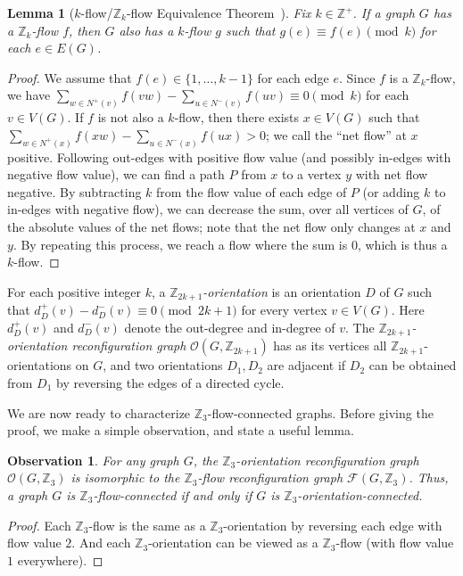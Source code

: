 \documentclass[a4paper,12pt]{article}
\theoremstyle{plain}
\newtheorem{lem}[theorem]{Lemma}
\newtheorem{obs}[theorem]{Observation}
\theoremstyle{definition}
\newcommand{\Z}{\mathbb{Z}}
\newcommand\F{\mathcal{F}}
\renewcommand\O{\mathcal{O}}
\begin{document}
\begin{lem}[$k$-flow/$\Z_k$-flow Equivalence Theorem~\cite{tutte54}]
	\label{Zk-k-equiv-lem}
	Fix $k\in \Z^+$.  If a graph $G$ has a $\Z_k$-flow $f$, then $G$ also has a $k$-flow 
	$g$ such that $g(e)\equiv f(e)\pmod k$ for each $e\in E(G)$.
\end{lem}
\begin{proof}
	We assume that $f(e)\in\{1,\ldots,k-1\}$ for each edge $e$. Since $f$ is a $\Z_k$-flow, we have $\sum_{w\in N^+(v)}f(vw) - \sum_{u\in N^-(v)}f(uv) \equiv 0 \pmod k$ for each $v\in V(G)$.
	If $f$ is not also a $k$-flow, then there exists $x\in V(G)$ such that $\sum_{w\in N^+(x)}f(xw) - \sum_{u\in N^-(x)}f(ux) >0$; we call the ``net flow'' at $x$ positive.  
	Following out-edges with positive flow value (and possibly in-edges with negative flow value), we can find a path $P$ from $x$ to a vertex $y$ with net flow negative.  By subtracting $k$ from the flow value of each edge of $P$ (or adding $k$ to in-edges with negative flow), we can decrease the sum, over all vertices of $G$, of the absolute values of the net flows; note that the net flow only changes at $x$ and $y$. By repeating this process, we reach a flow where the sum is $0$, which is thus a $k$-flow.
\end{proof}

For each positive integer $k$, a \emph{$\Z_{2k+1}$-orientation} is an orientation $D$ of $G$ such that 
$d_D^+(v) - d_D^-(v) \equiv 0 \pmod{2k+1}$
for every vertex $v\in V(G)$.
Here $d_D^+(v)$ and $d_D^-(v)$ denote the out-degree and in-degree of $v$.
The \emph{$\Z_{2k+1}$-orientation reconfiguration graph} $\O(G,\Z_{2k+1})$ has  as its vertices all $\Z_{2k+1}$-orientations on $G$, and two orientations $D_1,D_2$ are adjacent if $D_2$ can be obtained from $D_1$ by reversing the edges of a directed cycle.

We are now ready to characterize $\Z_3$-flow-connected graphs.  
Before giving the proof, we make a simple observation, and state a useful lemma.

\begin{obs}\label{Z3-obs}
	For any graph $G$, the $\Z_3$-orientation reconfiguration graph $\O(G,\Z_3)$ is isomorphic to the $\Z_3$-flow reconfiguration graph $\F(G, \Z_3)$. 
	Thus, a graph $G$ is $\Z_3$-flow-connected if and only if $G$ is $\Z_3$-orientation-connected.
\end{obs}
\begin{proof}
Each $\Z_3$-flow is the same as a $\Z_3$-orientation by reversing each edge with flow value $2$. 
And each $\Z_3$-orientation can be viewed as a $\Z_3$-flow (with flow value $1$ everywhere). 
\end{proof}
\end{document}
